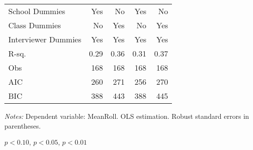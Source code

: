 \begin{table}[htbp]
\begin{threeparttable}
\begin{tabular}{l*{4}{D{.}{.}{-1}}}
School Dummies      &                 Yes   &                  No   &                 Yes   &                  No   \\
Class Dummies       &                  No   &                 Yes   &                  No   &                 Yes   \\
Interviewer Dummies &                 Yes   &                 Yes   &                 Yes   &                 Yes   \\
\midrule
R-sq.               &                0.29   &                0.36   &                0.31   &                0.37   \\
Obs                 &                 168   &                 168   &                 168   &                 168   \\
AIC                 &                 260   &                 271   &                 256   &                 270   \\
BIC                 &                 388   &                 443   &                 388   &                 445   \\
\bottomrule
\end{tabular}
\begin{tablenotes}
\footnotesize
\item \textit{Notes:} Dependent variable: MeanRoll. OLS estimation. Robust standard errors in parentheses. 
\item \sym{*} \(p<0.10\), \sym{**} \(p<0.05\), \sym{***} \(p<0.01\)
\end{tablenotes}
\end{threeparttable}
\label{tab:cheat_mathaltr}
\end{table}